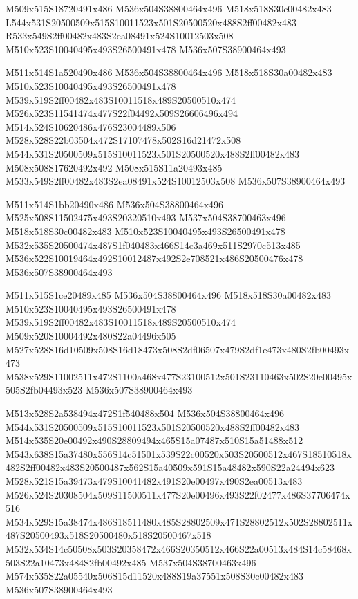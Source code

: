 \documentclass{article}
\begin{document}
\begin{multicols}{5}
\begin{center}

M509x515S18720491x486 %
M536x504S38800464x496 %
M518x518S30c00482x483 %
L544x531S20500509x515S10011523x501S20500520x488S2ff00482x483 %
R533x549S2ff00482x483S2ea08491x524S10012503x508 %
M510x523S10040495x493S26500491x478 %
M536x507S38900464x493 %
\vfil
\columnbreak

M511x514S1a520490x486 %
M536x504S38800464x496 %
M518x518S30a00482x483 %
M510x523S10040495x493S26500491x478 %
M539x519S2ff00482x483S10011518x489S20500510x474 %
M526x523S11541474x477S22f04492x509S26606496x494 %
M514x524S10620486x476S23004489x506 %
M528x528S22b03504x472S17107478x502S16d21472x508 %
M544x531S20500509x515S10011523x501S20500520x488S2ff00482x483 %
M508x508S17620492x492 %
M508x515S11a20493x485 %
M533x549S2ff00482x483S2ea08491x524S10012503x508 %
M536x507S38900464x493 %
\vfil
\columnbreak

M511x514S1bb20490x486 %
M536x504S38800464x496 %
M525x508S11502475x493S20320510x493 %
M537x504S38700463x496 %
M518x518S30c00482x483 %
M510x523S10040495x493S26500491x478 %
M532x535S20500474x487S1f040483x466S14c3a469x511S2970c513x485 %
M536x522S10019464x492S10012487x492S2e708521x486S20500476x478 %
M536x507S38900464x493 %
\vfil
\columnbreak

M511x515S1ce20489x485 %
M536x504S38800464x496 %
M518x518S30a00482x483 %
M510x523S10040495x493S26500491x478 %
M539x519S2ff00482x483S10011518x489S20500510x474 %
M509x520S10004492x480S22a04496x505 %
M527x528S16d10509x508S16d18473x508S2df06507x479S2df1e473x480S2fb00493x473 %
M538x529S11002511x472S1100a468x477S23100512x501S23110463x502S20e00495x505S2fb04493x523 %
M536x507S38900464x493 %
\vfil
\columnbreak

M513x528S2a538494x472S1f540488x504 %
M536x504S38800464x496 %
M544x531S20500509x515S10011523x501S20500520x488S2ff00482x483 %
M514x535S20e00492x490S28809494x465S15a07487x510S15a51488x512 %
M543x638S15a37480x556S14c51501x539S22c00520x503S20500512x467S18510518x482S2ff00482x483S20500487x562S15a40509x591S15a48482x590S22a24494x623 %
M528x521S15a39473x479S10041482x491S20e00497x490S2ea00513x483 %
M526x524S20308504x509S11500511x477S20e00496x493S22f02477x486S37706474x516 %
M534x529S15a38474x486S18511480x485S28802509x471S28802512x502S28802511x487S20500493x518S20500480x518S20500467x518 %
M532x534S14c50508x503S20358472x466S20350512x466S22a00513x484S14c58468x503S22a10473x484S2fb00492x485 %
M537x504S38700463x496 %
M574x535S22a05540x506S15d11520x488S19a37551x508S30c00482x483 %
M536x507S38900464x493 %
\vfil

\end{center}
\end{multicols}
\end{document}
